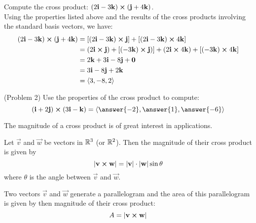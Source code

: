 \documentclass[handout]{ximera}
\begin{document}
\begin{example}[Example 2]
Compute the cross product: $(2\mathbf{i} - 3\mathbf{k}) \boldsymbol\times (\mathbf{j} + 4\mathbf{k})$.\\
Using the properties listed above and the results of the cross products involving the standard basis vectors, we have:
\begin{align*}
(2\mathbf{i} - 3\mathbf{k}) \boldsymbol\times (\mathbf{j} + 4\mathbf{k}) & = [(2\mathbf{i} - 3\mathbf{k}) \boldsymbol\times \mathbf{j}] + [(2\mathbf{i} - 3\mathbf{k}) \boldsymbol\times   4\mathbf{k}]\\
                                  &= (2\mathbf{i} \boldsymbol\times \mathbf{j}) + [(-3\mathbf{k}) \boldsymbol\times \mathbf{j})] +(2\mathbf{i} \boldsymbol\times   4\mathbf{k}) + [ (- 3\mathbf{k}) \boldsymbol\times   4\mathbf{k}]\\
                                  &= 2\mathbf{k} + 3 \mathbf{i} -8\mathbf{j} + \mathbf{0}\\
                                  &= 3\mathbf{i} - 8\mathbf{j} +2\mathbf{k}\\
                                  &= \left\langle 3, -8, 2\right\rangle
\end{align*}
\end{example}

\begin{problem}(Problem 2)
Use the properties of the cross product to compute: 
\[
(\vec{i} + 2\vec{j}) \cross (3\vec{i} - \vec{k}) = \vector{\answer{-2},\answer{1},\answer{-6}}
\]
\end{problem}



The magnitude of a cross product is of great interest in applications.
\begin{proposition}
Let $\vec{v}$ and $\vec{w}$ be vectors in $\mathbb R^3$ (or $\mathbb R^2$). Then the magnitude of their cross product is given by
\[
|\mathbf{v} \boldsymbol\times \mathbf{w}| = |\mathbf{v}| \cdot |\mathbf{w}| \sin \theta
\]
where $\theta$ is the angle between $\vec{v}$ and $\vec{w}$.
\end{proposition}

Two vectors $\vec{v}$ and $\vec{w}$ generate a parallelogram and the area of this parallelogram is given by then magnitude of their cross product:
\[
A = |\mathbf{v} \boldsymbol\times \mathbf{w}|
\]

\begin{image}
\end{image}
\end{document}
